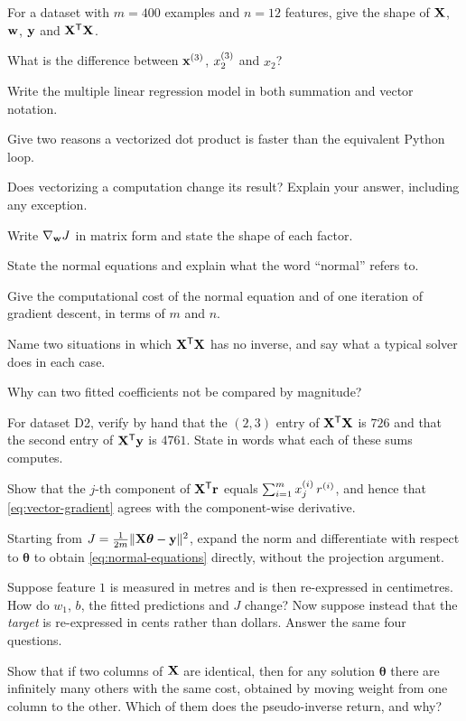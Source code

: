 
\sq For a dataset with $m = 400$ examples and $n = 12$ features, give the shape
of $\mathbf{X}$, $\mathbf{w}$, $\mathbf{y}$ and $\mathbf{X}^{\mathsf{T}}\mathbf{X}$.

\sq What is the difference between $\mathbf{x}^{(3)}$, $x^{(3)}_{2}$ and $x_2$?

\sq Write the multiple linear regression model in both summation and vector
notation.

\sq Give two reasons a vectorized dot product is faster than the equivalent
Python loop.

\sq Does vectorizing a computation change its result? Explain your answer,
including any exception.

\sq Write $\nabla_{\mathbf{w}}J$ in matrix form and state the shape of each factor.

\sq State the normal equations and explain what the word ``normal'' refers to.

\sq Give the computational cost of the normal equation and of one iteration of
gradient descent, in terms of $m$ and $n$.

\sq Name two situations in which $\mathbf{X}^{\mathsf{T}}\mathbf{X}$ has no inverse, and
say what a typical solver does in each case.

\sq Why can two fitted coefficients not be compared by magnitude?


\ap For dataset D2, verify by hand that the $(2,3)$ entry of
$\mathbf{X}^{\mathsf{T}}\mathbf{X}$ is $726$ and that the second entry of
$\mathbf{X}^{\mathsf{T}}\mathbf{y}$ is $4761$. State in words what each of these sums
computes.

\ap Show that the $j$-th component of $\mathbf{X}^{\mathsf{T}}\mathbf{r}$ equals
$\sum_{i=1}^{m} x^{(i)}_{j}\,r^{(i)}$, and hence that
\cref{eq:vector-gradient} agrees with the component-wise derivative.

\ap Starting from $J = \frac{1}{2m}\|\mathbf{X}\bm{\theta}-\mathbf{y}\|^2$, expand the norm
and differentiate with respect to $\bm{\theta}$ to obtain
\cref{eq:normal-equations} directly, without the projection argument.

\ap Suppose feature $1$ is measured in metres and is then re-expressed in
centimetres. How do $w_1$, $b$, the fitted predictions and $J$ change? Now
suppose instead that the \emph{target} is re-expressed in cents rather than
dollars. Answer the same four questions.

\ap Show that if two columns of $\mathbf{X}$ are identical, then for any solution
$\bm{\theta}$ there are infinitely many others with the same cost, obtained by
moving weight from one column to the other. Which of them does the pseudo-inverse
return, and why?

